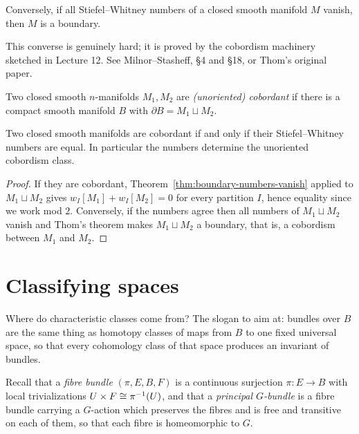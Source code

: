 \begin{theorem}
Conversely, if all Stiefel--Whitney numbers of a closed smooth manifold $M$
vanish, then $M$ is a boundary.
\end{theorem}

This converse is genuinely hard; it is proved by the cobordism machinery
sketched in Lecture 12. See Milnor--Stasheff, \S 4 and \S 18, or Thom's original
paper.

\begin{definition}
Two closed smooth $n$-manifolds $M_1,M_2$ are \emph{(unoriented) cobordant} if
there is a compact smooth manifold $B$ with $\partial B=M_1\sqcup M_2$.
\end{definition}

\begin{corollary}
Two closed smooth manifolds are cobordant if and only if their
Stiefel--Whitney numbers are equal. In particular the numbers determine the
unoriented cobordism class.
\end{corollary}

\begin{proof}
If they are cobordant, Theorem~\ref{thm:boundary-numbers-vanish} applied to
$M_1\sqcup M_2$ gives $w_I[M_1]+w_I[M_2]=0$ for every partition $I$, hence
equality since we work mod $2$. Conversely, if the numbers agree then all
numbers of $M_1\sqcup M_2$ vanish and Thom's theorem makes $M_1\sqcup M_2$ a
boundary, that is, a cobordism between $M_1$ and $M_2$.
\end{proof}

\section{Classifying spaces}

\begin{guiding}
Where do characteristic classes come from? The slogan to aim at: bundles over
$B$ are the same thing as homotopy classes of maps from $B$ to one fixed
universal space, so that every cohomology class of that space produces an
invariant of bundles.
\end{guiding}

Recall that a \emph{fibre bundle} $(\pi,E,B,F)$ is a continuous surjection
$\pi\colon E\to B$ with local trivializations $U\times F\cong\pi^{-1}(U)$, and
that a \emph{principal $G$-bundle} is a fibre bundle carrying a $G$-action which
preserves the fibres and is free and transitive on each of them, so that each
fibre is homeomorphic to $G$.


